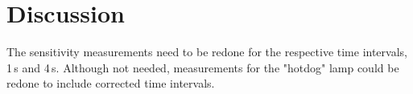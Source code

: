 \documentclass[twocolumn]{aastex6}
\newcommand\aastex{AAS\TeX}
\begin{document}

\section{Discussion}

The sensitivity measurements need to be redone for the respective time intervals, 1\,s and 4\,s. Although not needed, measurements for the "hotdog" lamp could be redone to include corrected time intervals.


%
%
%







\end{document}
